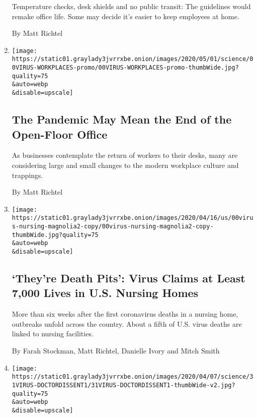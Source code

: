 \begin{enumerate}
  Temperature checks, desk shields and no public transit: The guidelines
  would remake office life. Some may decide it's easier to keep
  employees at home.

  By Matt Richtel
\item
  \href{/2020/05/04/health/coronavirus-office-makeover.html}{}

  \texttt{[image: https://static01.graylady3jvrrxbe.onion/images/2020/05/01/science/00VIRUS-WORKPLACES-promo/00VIRUS-WORKPLACES-promo-thumbWide.jpg?quality=75\\\&auto=webp\\\&disable=upscale]}

  \hypertarget{the-pandemic-may-mean-the-end-of-the-open-floor-office}{%
  \subsection{The Pandemic May Mean the End of the Open-Floor
  Office}\label{the-pandemic-may-mean-the-end-of-the-open-floor-office}}

  As businesses contemplate the return of workers to their desks, many
  are considering large and small changes to the modern workplace
  culture and trappings.

  By Matt Richtel
\item
  \href{/2020/04/17/us/coronavirus-nursing-homes.html}{}

  \texttt{[image: https://static01.graylady3jvrrxbe.onion/images/2020/04/16/us/00virus-nursing-magnolia2-copy/00virus-nursing-magnolia2-copy-thumbWide.jpg?quality=75\\\&auto=webp\\\&disable=upscale]}

  \hypertarget{theyre-death-pits-virus-claims-at-least-7000-lives-in-us-nursing-homes}{%
  \subsection{`They're Death Pits': Virus Claims at Least 7,000 Lives in
  U.S. Nursing
  Homes}\label{theyre-death-pits-virus-claims-at-least-7000-lives-in-us-nursing-homes}}

  More than six weeks after the first coronavirus deaths in a nursing
  home, outbreaks unfold across the country. About a fifth of U.S. virus
  deaths are linked to nursing facilities.

  By Farah Stockman, Matt Richtel, Danielle Ivory and Mitch Smith
\item
  \href{/2020/03/31/health/hospitals-coronavirus-face-masks.html}{}

  \texttt{[image: https://static01.graylady3jvrrxbe.onion/images/2020/04/07/science/31VIRUS-DOCTORDISSENT1/31VIRUS-DOCTORDISSENT1-thumbWide-v2.jpg?quality=75\\\&auto=webp\\\&disable=upscale]}


\end{enumerate}
